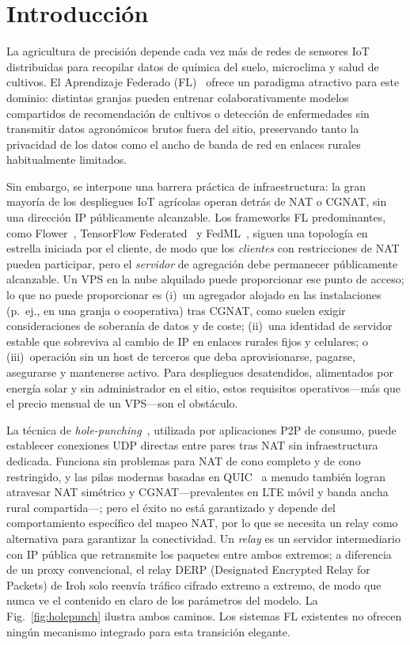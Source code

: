\documentclass[journal]{IEEEtran}
\begin{document}
\section{Introducción}
\label{sec:introduction}

La agricultura de precisión depende cada vez más de redes de sensores IoT distribuidas para recopilar datos de química del suelo, microclima y salud de cultivos. El Aprendizaje Federado (FL)~\cite{mcmahan2017} ofrece un paradigma atractivo para este dominio: distintas granjas pueden entrenar colaborativamente modelos compartidos de recomendación de cultivos o detección de enfermedades sin transmitir datos agronómicos brutos fuera del sitio, preservando tanto la privacidad de los datos como el ancho de banda de red en enlaces rurales habitualmente limitados.

Sin embargo, se interpone una barrera práctica de infraestructura: la gran mayoría de los despliegues IoT agrícolas operan detrás de NAT o CGNAT, sin una dirección IP públicamente alcanzable. Los frameworks FL predominantes, como Flower~\cite{flower2022}, TensorFlow Federated~\cite{tff2019} y FedML~\cite{fedml2020}, siguen una topología en estrella iniciada por el cliente, de modo que los \emph{clientes} con restricciones de NAT pueden participar, pero el \emph{servidor} de agregación debe permanecer públicamente alcanzable. Un VPS en la nube alquilado puede proporcionar ese punto de acceso; lo que no puede proporcionar es (i)~un agregador alojado en las instalaciones (p.~ej., en una granja o cooperativa) tras CGNAT, como suelen exigir consideraciones de soberanía de datos y de coste; (ii)~una identidad de servidor estable que sobreviva al cambio de IP en enlaces rurales fijos y celulares; o (iii)~operación sin un host de terceros que deba aprovisionarse, pagarse, asegurarse y mantenerse activo. Para despliegues desatendidos, alimentados por energía solar y sin administrador en el sitio, estos requisitos operativos---más que el precio mensual de un VPS---son el obstáculo.

La técnica de \emph{hole-punching}~\cite{ford2005}, utilizada por aplicaciones P2P de consumo, puede establecer conexiones UDP directas entre pares tras NAT sin infraestructura dedicada. Funciona sin problemas para NAT de cono completo y de cono restringido, y las pilas modernas basadas en QUIC~\cite{rfc9000} a menudo también logran atravesar NAT simétrico y CGNAT---prevalentes en LTE móvil y banda ancha rural compartida---; pero el éxito no está garantizado y depende del comportamiento específico del mapeo NAT, por lo que se necesita un relay como alternativa para garantizar la conectividad. Un \emph{relay} es un servidor intermediario con IP pública que retransmite los paquetes entre ambos extremos; a diferencia de un proxy convencional, el relay DERP (Designated Encrypted Relay for Packets) de Iroh solo reenvía tráfico cifrado extremo a extremo, de modo que nunca ve el contenido en claro de los parámetros del modelo. La Fig.~\ref{fig:holepunch} ilustra ambos caminos. Los sistemas FL existentes no ofrecen ningún mecanismo integrado para esta transición elegante.
\end{document}
